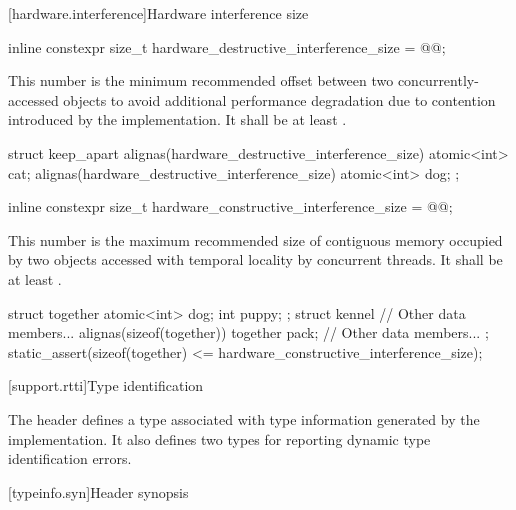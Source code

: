 [hardware.interference]{Hardware interference size}

%
\begin{itemdecl}
inline constexpr size_t hardware_destructive_interference_size = @\impdef{}@;
\end{itemdecl}

\pnum
This number is the minimum recommended offset
between two concurrently-accessed objects
to avoid additional performance degradation due to contention
introduced by the implementation.
It shall be at least .

%
\begin{example}
\begin{codeblock}
struct keep_apart {
  alignas(hardware_destructive_interference_size) atomic<int> cat;
  alignas(hardware_destructive_interference_size) atomic<int> dog;
};
\end{codeblock}
\end{example}

%
\begin{itemdecl}
inline constexpr size_t hardware_constructive_interference_size = @\impdef{}@;
\end{itemdecl}

\pnum
This number is the maximum recommended size of contiguous memory
occupied by two objects accessed with temporal locality by concurrent threads.
It shall be at least .

%
\begin{example}
\begin{codeblock}
struct together {
  atomic<int> dog;
  int puppy;
};
struct kennel {
  // Other data members...
  alignas(sizeof(together)) together pack;
  // Other data members...
};
static_assert(sizeof(together) <= hardware_constructive_interference_size);
\end{codeblock}
\end{example}

[support.rtti]{Type identification}

\pnum
The header
defines a
type associated with type information generated by the implementation.
It also defines two types for reporting dynamic type identification errors.

[typeinfo.syn]{Header  synopsis}
%
%
%
%


